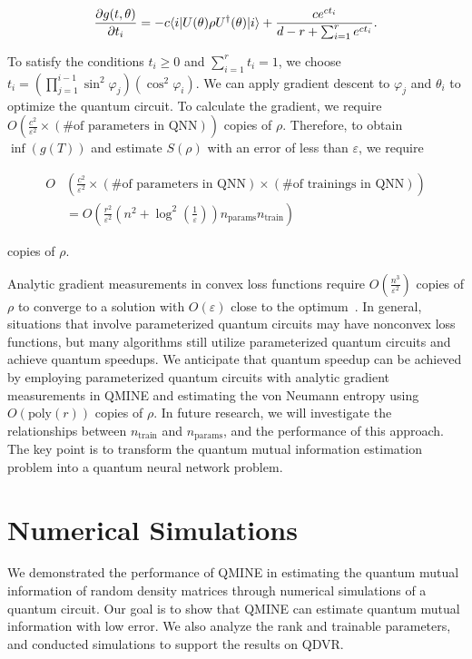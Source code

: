 \documentclass[aps,groupedaddress,superscriptaddress,amssymb,amsmath,amsbsy,amsfonts,twocolumn,pra]{revtex4}
\begin{document}
\begin{equation}
\frac{\partial g(t, \theta)}{\partial t_i} = -c\langle i|U(\theta)\rho U^{\dagger}(\theta)|i\rangle + \frac{ce^{ct_i}}{d-r+\sum^r_{i=1} e^{ct_i}}.
\end{equation}

To satisfy the conditions $t_i \geq 0$ and $\sum^r_{i=1} t_i = 1$, we choose $t_i = \left(\prod^{i-1}_{j=1} \sin^2\varphi_j\right)\left(\cos^2\varphi_i\right)$. We can apply gradient descent to $\varphi_j$ and $\theta_i$ to optimize the quantum circuit. To calculate the gradient, we require $O\left(\frac{c^2}{\varepsilon^{2}} \times \left(\text{\# of parameters in QNN}\right)\right)$ copies of $\rho$. Therefore, to obtain $\inf\left(g\left(T\right)\right)$ and estimate $S\left(\rho\right)$ with an error of less than $\varepsilon$, we require

\begin{widetext}
\begin{align}
O&\left(\frac{c^2}{\varepsilon^{2}} \times \left(\text{\# of parameters in QNN}\right) \times \left(\text{\# of trainings in QNN}\right)\right) \nonumber\\
&= O\left(\frac{r^2}{\varepsilon^2}\left(n^2+\log^2\left(\frac{1}{\varepsilon}\right)\right)n_\text{params}n_\text{train}\right)
\end{align}
\end{widetext}
copies of $\rho$.

Analytic gradient measurements in convex loss functions require $O(\frac{n^3}{\varepsilon^2})$ copies of $\rho$ to converge to a solution with $O(\varepsilon)$ close to the optimum~\cite{HN21}. In general, situations that involve parameterized quantum circuits may have nonconvex loss functions, but many algorithms still utilize parameterized quantum circuits and achieve quantum speedups. We anticipate that quantum speedup can be achieved by employing parameterized quantum circuits with analytic gradient measurements in QMINE and estimating the von Neumann entropy using $O(\text{poly}(r))$ copies of $\rho$. In future research, we will investigate the relationships between $n_\text{train}$ and $n_\text{params}$, and the performance of this approach. The key point is to transform the quantum mutual information estimation problem into a quantum neural network problem.

\section{Numerical Simulations} \label{sec:ns}
We demonstrated the performance of QMINE in estimating the quantum mutual information of random density matrices through numerical simulations of a quantum circuit. Our goal is to show that QMINE can estimate quantum mutual information with low error. We also analyze the rank and trainable parameters, and conducted simulations to support the results on QDVR.
\end{document}
